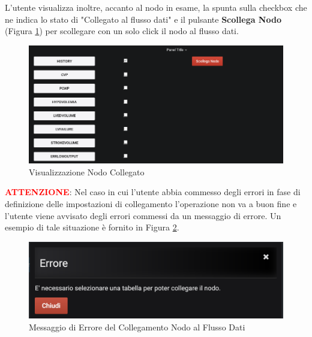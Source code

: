 L'utente visualizza inoltre, accanto al nodo in esame, la spunta sulla checkbox che ne indica lo stato di "Collegato al flusso dati" e il pulsante \textbf{Scollega Nodo} (Figura \ref{NodoCollegato}) per scollegare con un solo click il nodo al flusso dati.
 
 \begin{figure}[H]
	\begin{center}
		\includegraphics[scale=0.4]{./images/NodoCollegato.png}
		 \caption{Visualizzazione Nodo Collegato}	
		 \label{NodoCollegato}
	\end{center}
\end{figure}

\textbf{\textcolor{red}{ATTENZIONE}}: Nel caso in cui l'utente abbia commesso degli errori in fase di definizione delle impostazioni di collegamento l'operazione non va a buon fine e l'utente viene avvisato degli errori commessi da un messaggio di errore. Un esempio di tale situazione è fornito in Figura \ref{ErroreCollegamento}.

\begin{figure}[H]
	\begin{center}
		\includegraphics[scale=0.6]{./images/ErroreCollegamento.png}
		 \caption{Messaggio di Errore del Collegamento Nodo al Flusso Dati}	
		 \label{ErroreCollegamento}
	\end{center}
\end{figure}
 